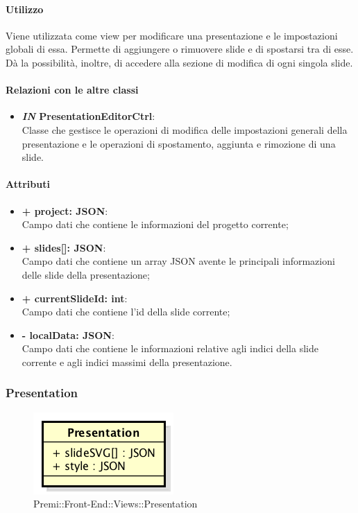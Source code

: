 	\paragraph{Utilizzo}
	Viene utilizzata come view per modificare una presentazione e le impostazioni globali di essa. Permette di aggiungere o rimuovere slide e di spostarsi tra di esse. Dà la possibilità, inoltre, di accedere alla sezione di modifica di ogni singola slide.
	
	\paragraph{Relazioni con le altre classi}
	\begin{itemize}
		\item \textbf{\textit{IN} PresentationEditorCtrl}:\\
		Classe che gestisce le operazioni di modifica delle impostazioni generali della presentazione e le operazioni di spostamento, aggiunta e rimozione di una slide.
	\end{itemize}
	
	\paragraph{Attributi}
	\begin{itemize}
		\item \textbf{+ project: JSON}:\\
		Campo dati che contiene le informazioni del progetto corrente;
		\item \textbf{+ slides[]: JSON}:\\
		Campo dati che contiene un array JSON avente le principali informazioni delle slide della presentazione;
		\item \textbf{+ currentSlideId: int}:\\
		Campo dati che contiene l'id della slide corrente;
		\item \textbf{- localData: JSON}:\\
		Campo dati che contiene le informazioni relative agli indici della slide corrente e agli indici massimi della presentazione.
	\end{itemize}
\newpage
	
	
\subsubsection{Presentation}
	\begin{figure}[h]
		\centering
		\includegraphics[width=0.3\linewidth]{img/premi_front_end_views_presentation}
		\caption[Premi::Front-End::Views::Presentation]{Premi::Front-End::Views::Presentation}
	\end{figure}
	
